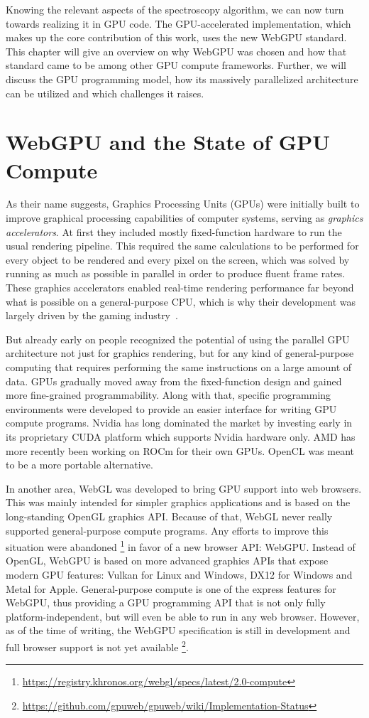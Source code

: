 Knowing the relevant aspects of the spectroscopy algorithm,
we can now turn towards realizing it in GPU code.
The GPU-accelerated implementation,
which makes up the core contribution of this work,
uses the new WebGPU standard.
This chapter will give an overview on why WebGPU was chosen and how that
standard came to be among other GPU compute frameworks.
Further, we will discuss the GPU programming model,
how its massively parallelized architecture can be utilized
and which challenges it raises.

\section{WebGPU and the State of GPU Compute}

As their name suggests, Graphics Processing Units (GPUs) were initially built
to improve graphical processing capabilities of computer systems,
serving as \emph{graphics accelerators}.
At first they included mostly fixed-function hardware to run the usual
rendering pipeline.
This required the same calculations to be performed for every object to
be rendered and every pixel on the screen,
which was solved by running as much as possible in parallel in order to produce
fluent frame rates.
These graphics accelerators enabled real-time rendering performance far beyond
what is possible on a general-purpose CPU,
which is why their development was largely driven
by the gaming industry~\cite{Patterson2016}.

But already early on people recognized the potential of using the parallel
GPU architecture not just for graphics rendering,
but for any kind of general-purpose computing that requires performing the same
instructions on a large amount of data.
GPUs gradually moved away from the fixed-function design and gained more
fine-grained programmability.
Along with that, specific programming environments were
developed to provide an easier interface for writing GPU compute programs.
Nvidia has long dominated the market by investing early in its
proprietary CUDA platform which supports Nvidia hardware only.
AMD has more recently been working on ROCm for their own GPUs.
OpenCL was meant to be a more portable alternative.

In another area, WebGL was developed to bring GPU support into web browsers.
This was mainly intended for simpler graphics applications and is based on the
long-standing OpenGL graphics API\@.
Because of that, WebGL never really supported general-purpose compute programs.
Any efforts to improve this situation were abandoned%
\footnote{\url{https://registry.khronos.org/webgl/specs/latest/2.0-compute}}
in favor of a new browser API\@: WebGPU\@.
Instead of OpenGL, WebGPU is based on more advanced graphics APIs
that expose modern GPU features:
Vulkan for Linux and Windows, DX12 for Windows and Metal for Apple.
General-purpose compute is one of the express features for WebGPU,
thus providing a GPU programming API that is not only fully
platform-independent, but will even be able to run in any web browser.
However, as of the time of writing, the WebGPU specification is still in
development and full browser support is not yet available%
\footnote{\url{https://github.com/gpuweb/gpuweb/wiki/Implementation-Status}}.

